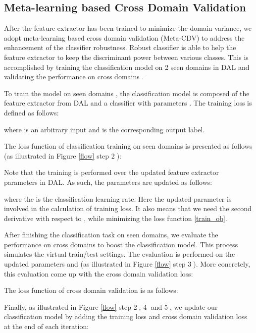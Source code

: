\documentclass[twocolumn,preprint]{elsarticle}
\begin{document}
\subsection{Meta-learning based Cross Domain Validation} \label{Meta-CDV}
After the feature extractor has been trained to minimize the domain variance, we adopt meta-learning based cross domain validation (Meta-CDV) to address the enhancement of the classifier robustness. Robust classifier is able to help the feature extractor to keep the discriminant power between various classes. This is accomplished by training the classification model on 2 seen domains  in DAL and validating the performance on cross domains . 



To train the model on seen domains , the classification model is composed of the feature extractor \textit{} from DAL and a classifier \textit{} with parameters . The training loss is defined as follows:



where  is an arbitrary input and  is the corresponding output label. 

The loss function of classification training on seen domains is presented as follows (as illustrated in Figure \ref{flow} step \textcircled{2}):


Note that the training is performed over the updated feature extractor parameters  in DAL. As such, the parameters are updated as follows:


where the  is the classification learning rate. Here the updated parameter  is involved in the calculation of training loss. It also means that we need the second derivative with respect to , while minimizing the loss function \ref{train_ob}.

After finishing the classification task on seen domains, we evaluate the performance on cross domains  to boost the classification model. This process simulates the virtual train/test settings. The evaluation is performed on the updated parameters  and  (as illustrated in Figure \ref{flow} step \textcircled{3}). More concretely, this evaluation come up with the cross domain validation loss: 



The loss function of cross domain validation is as follows:


Finally, as illustrated in Figure \ref{flow} step \textcircled{2}, \textcircled{4} and \textcircled{5}, we update our classification model by adding the training loss  and cross domain validation loss  at the end of each iteration:
\end{document}
